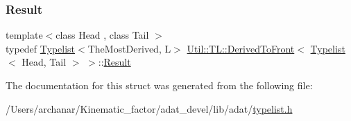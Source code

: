 \mbox{\label{structUtil_1_1TL_1_1DerivedToFront_3_01Typelist_3_01Head_00_01Tail_01_4_01_4_ae5fcbfce9e50c52c4c5cfe7626e32ddd}} 
\subsubsection{\texorpdfstring{Result}{Result}\hspace{0.1cm}{\footnotesize\ttfamily [2/2]}}
{\footnotesize\ttfamily template$<$class Head , class Tail $>$ \\
typedef \mbox{\hyperlink{structUtil_1_1Typelist}{Typelist}}$<$The\+Most\+Derived, L$>$ \mbox{\hyperlink{structUtil_1_1TL_1_1DerivedToFront}{Util\+::\+T\+L\+::\+Derived\+To\+Front}}$<$ \mbox{\hyperlink{structUtil_1_1Typelist}{Typelist}}$<$ Head, Tail $>$ $>$\+::\mbox{\hyperlink{structUtil_1_1TL_1_1DerivedToFront_3_01Typelist_3_01Head_00_01Tail_01_4_01_4_ae5fcbfce9e50c52c4c5cfe7626e32ddd}{Result}}}



The documentation for this struct was generated from the following file\+:\begin{DoxyCompactItemize}
\item 
/\+Users/archanar/\+Kinematic\+\_\+factor/adat\+\_\+devel/lib/adat/\mbox{\hyperlink{lib_2adat_2typelist_8h}{typelist.\+h}}\end{DoxyCompactItemize}
